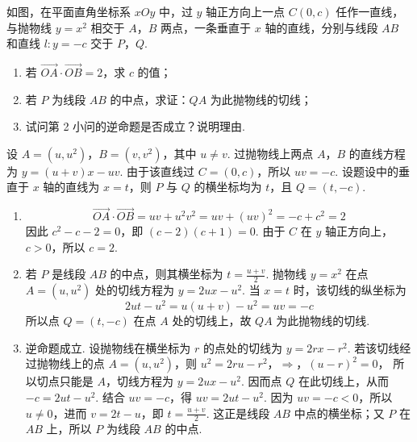 \begin{problem}
如图，在平面直角坐标系 \(xOy\) 中，过 \(y\) 轴正方向上一点 \(C(0, c)\) 任作一直线，与抛物线 \(y = x^{2}\) 相交于 \(A\)，\(B\) 两点，一条垂直于 \(x\) 轴的直线，分别与线段 \(AB\) 和直线 \(l: y = -c\) 交于 \(P\)，\(Q\).

\begin{enumerate}
\item 若 \(\overrightarrow{OA} \cdot \overrightarrow{OB} = 2\)，求 \(c\) 的值；
\item 若 \(P\) 为线段 \(AB\) 的中点，求证：\(QA\) 为此抛物线的切线；
\item 试问第 2 小问的逆命题是否成立？说明理由.
\end{enumerate}

\end{problem}

\begin{solution}
设 \(A=(u,u^{2})\)，\(B=(v,v^{2})\)，其中 \(u\neq v\). 过抛物线上两点 \(A\)，\(B\) 的直线方程为 \(y=(u+v)x-uv\). 由于该直线过 \(C=(0,c)\)，所以
\(uv=-c\).
设题设中的垂直于 \(x\) 轴的直线为 \(x=t\)，则 \(P\) 与 \(Q\) 的横坐标均为 \(t\)，且 \(Q=(t,-c)\).

\begin{enumerate}
\item
\[
\overrightarrow{OA}\cdot\overrightarrow{OB}=uv+u^{2}v^{2}=uv+(uv)^{2}=-c+c^{2}=2
\]
因此 \(c^{2}-c-2=0\)，即 \((c-2)(c+1)=0\). 由于 \(C\) 在 \(y\) 轴正方向上，\(c>0\)，所以 \(c=2\).
\item 若 \(P\) 是线段 \(AB\) 的中点，则其横坐标为 \(t=\frac{u+v}{2}\).
抛物线 \(y=x^{2}\) 在点 \(A=(u,u^{2})\) 处的切线方程为 \(y=2ux-u^{2}\). 当 \(x=t\) 时，该切线的纵坐标为
\[
2ut-u^{2}=u(u+v)-u^{2}=uv=-c
\]
所以点 \(Q=(t,-c)\) 在点 \(A\) 处的切线上，故 \(QA\) 为此抛物线的切线.
\item 逆命题成立. 设抛物线在横坐标为 \(r\) 的点处的切线为 \(y=2rx-r^{2}\). 若该切线经过抛物线上的点 \(A=(u,u^{2})\)，则
\(u^{2}=2ru-r^{2}\)，\(\Longrightarrow\)，\((u-r)^{2}=0\)，
所以切点只能是 \(A\)，切线方程为 \(y=2ux-u^{2}\). 因而点 \(Q\) 在此切线上，从而
\(-c=2ut-u^{2}\).
结合 \(uv=-c\)，得 \(uv=2ut-u^{2}\). 因为 \(uv=-c<0\)，所以 \(u\neq0\)，进而 \(v=2t-u\)，即 \(t=\frac{u+v}{2}\). 这正是线段 \(AB\) 中点的横坐标；又 \(P\) 在 \(AB\) 上，所以 \(P\) 为线段 \(AB\) 的中点.
\end{enumerate}
\end{solution}

